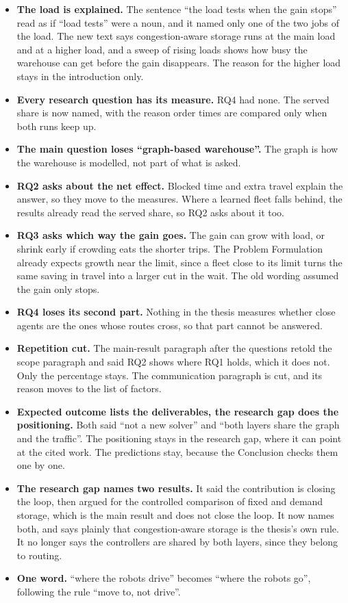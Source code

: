 \documentclass[11pt,a4paper]{article}
\begin{document}
\begin{itemize}[leftmargin=1.2em]
\item \textbf{The load is explained.} The sentence ``the load tests when the gain stops'' read as if
  ``load tests'' were a noun, and it named only one of the two jobs of the load. The new text says
  congestion-aware storage runs at the main load and at a higher load, and a sweep of rising loads
  shows how busy the warehouse can get before the gain disappears. The reason for the higher load
  stays in the introduction only.
\item \textbf{Every research question has its measure.} RQ4 had none. The served share is now named,
  with the reason order times are compared only when both runs keep up.
\item \textbf{The main question loses ``graph-based warehouse''.} The graph is how the warehouse is
  modelled, not part of what is asked.
\item \textbf{RQ2 asks about the net effect.} Blocked time and extra travel explain the answer, so
  they move to the measures. Where a learned fleet falls behind, the results already read the served
  share, so RQ2 asks about it too.
\item \textbf{RQ3 asks which way the gain goes.} The gain can grow with load, or shrink early if
  crowding eats the shorter trips. The Problem Formulation already expects growth near the limit, since
  a fleet close to its limit turns the same saving in travel into a larger cut in the wait. The old
  wording assumed the gain only stops.
\item \textbf{RQ4 loses its second part.} Nothing in the thesis measures whether close agents are
  the ones whose routes cross, so that part cannot be answered.
\item \textbf{Repetition cut.} The main-result paragraph after the questions retold the scope
  paragraph and said RQ2 shows where RQ1 holds, which it does not. Only the percentage stays. The
  communication paragraph is cut, and its reason moves to the list of factors.
\item \textbf{Expected outcome lists the deliverables, the research gap does the positioning.} Both
  said ``not a new solver'' and ``both layers share the graph and the traffic''. The positioning stays
  in the research gap, where it can point at the cited work. The predictions stay, because the
  Conclusion checks them one by one.
\item \textbf{The research gap names two results.} It said the contribution is closing the loop, then
  argued for the controlled comparison of fixed and demand storage, which is the main result and does
  not close the loop. It now names both, and says plainly that congestion-aware storage is the
  thesis's own rule. It no longer says the controllers are shared by both layers, since they belong
  to routing.
\item \textbf{One word.} ``where the robots drive'' becomes ``where the robots go'', following the
  rule ``move to, not drive''.
\end{itemize}
\end{document}
